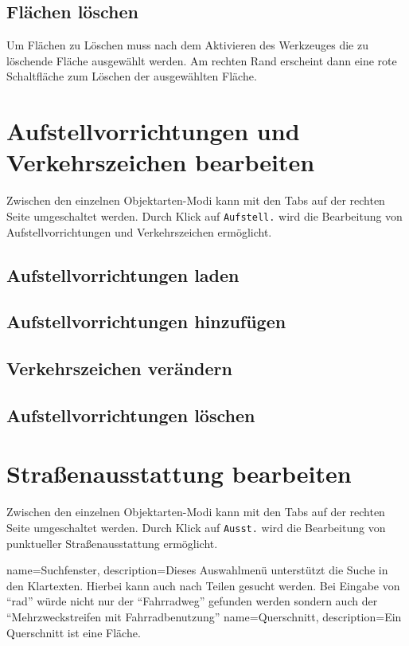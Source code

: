 \documentclass[a4paper,11pt,bibliography=totoc, listof=totoc,titlepage]{scrartcl}
\begin{document}
\subsection{Flächen löschen}
Um Flächen zu Löschen muss nach dem Aktivieren des Werkzeuges die zu löschende Fläche ausgewählt werden. Am rechten Rand erscheint dann eine rote Schaltfläche zum Löschen der ausgewählten Fläche.

\section{Aufstellvorrichtungen und Verkehrszeichen bearbeiten}
\label{s:schilder}
Zwischen den einzelnen Objektarten-Modi kann mit den Tabs auf der rechten Seite umgeschaltet werden. Durch Klick auf \verb|Aufstell.| wird die Bearbeitung von Aufstellvorrichtungen und Verkehrszeichen ermöglicht.

\subsection{Aufstellvorrichtungen laden}


\subsection{Aufstellvorrichtungen hinzufügen}

\subsection{Verkehrszeichen verändern}

\subsection{Aufstellvorrichtungen löschen}


\section{Straßenausstattung bearbeiten}
\label{s:straus}
Zwischen den einzelnen Objektarten-Modi kann mit den Tabs auf der rechten Seite umgeschaltet werden. Durch Klick auf \verb|Ausst.| wird die Bearbeitung von punktueller Straßenausstattung ermöglicht.


\clearpage

{
    name=Suchfenster,
    description={Dieses Auswahlmenü unterstützt die Suche in den Klartexten. Hierbei kann auch nach Teilen gesucht werden. Bei Eingabe von ``rad'' würde nicht nur der ``Fahrradweg'' gefunden werden sondern auch der ``Mehrzweckstreifen mit Fahrradbenutzung''}
}
{
    name=Querschnitt,
    description={Ein Querschnitt ist eine Fläche.}
}

\printglossaries
\end{document}
